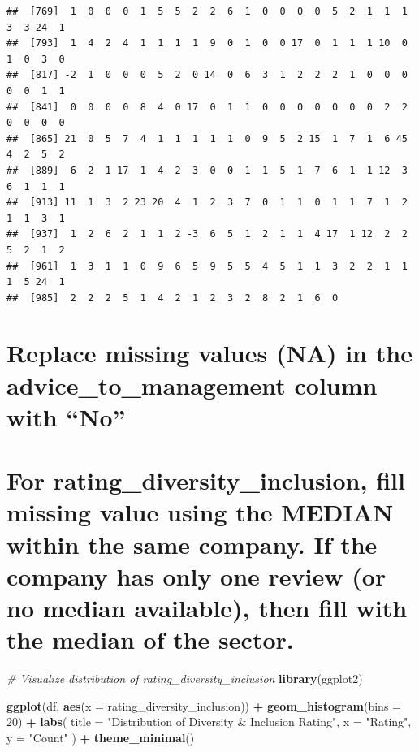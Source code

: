 \documentclass[
]{article}
\newenvironment{Shaded}{\begin{snugshade}}{\end{snugshade}}
\newcommand{\AttributeTok}[1]{\textcolor[rgb]{0.13,0.29,0.53}{#1}}
\newcommand{\CommentTok}[1]{\textcolor[rgb]{0.56,0.35,0.01}{\textit{#1}}}
\newcommand{\DecValTok}[1]{\textcolor[rgb]{0.00,0.00,0.81}{#1}}
\newcommand{\FunctionTok}[1]{\textcolor[rgb]{0.13,0.29,0.53}{\textbf{#1}}}
\newcommand{\NormalTok}[1]{#1}
\newcommand{\OtherTok}[1]{\textcolor[rgb]{0.56,0.35,0.01}{#1}}
\newcommand{\SpecialCharTok}[1]{\textcolor[rgb]{0.81,0.36,0.00}{\textbf{#1}}}
\newcommand{\StringTok}[1]{\textcolor[rgb]{0.31,0.60,0.02}{#1}}
\begin{document}
\begin{verbatim}
##  [769]  1  0  0  0  1  5  5  2  2  6  1  0  0  0  0  5  2  1  1  1  3  3 24  1
##  [793]  1  4  2  4  1  1  1  1  9  0  1  0  0 17  0  1  1  1 10  0  1  0  3  0
##  [817] -2  1  0  0  0  5  2  0 14  0  6  3  1  2  2  2  1  0  0  0  0  0  1  1
##  [841]  0  0  0  0  8  4  0 17  0  1  1  0  0  0  0  0  0  0  2  2  0  0  0  0
##  [865] 21  0  5  7  4  1  1  1  1  1  0  9  5  2 15  1  7  1  6 45  4  2  5  2
##  [889]  6  2  1 17  1  4  2  3  0  0  1  1  5  1  7  6  1  1 12  3  6  1  1  1
##  [913] 11  1  3  2 23 20  4  1  2  3  7  0  1  1  0  1  1  7  1  2  1  1  3  1
##  [937]  1  2  6  2  1  1  2 -3  6  5  1  2  1  1  4 17  1 12  2  2  5  2  1  2
##  [961]  1  3  1  1  0  9  6  5  9  5  5  4  5  1  1  3  2  2  1  1  1  5 24  1
##  [985]  2  2  2  5  1  4  2  1  2  3  2  8  2  1  6  0
\end{verbatim}

\section{Replace missing values (NA) in the advice\_to\_management
column with
``No''}\label{replace-missing-values-na-in-the-advice_to_management-column-with-no}

\begin{Shaded}
\end{Shaded}

\section{For rating\_diversity\_inclusion, fill missing value using the
MEDIAN within the same company. If the company has only one review (or
no median available), then fill with the median of the
sector.}\label{for-rating_diversity_inclusion-fill-missing-value-using-the-median-within-the-same-company.-if-the-company-has-only-one-review-or-no-median-available-then-fill-with-the-median-of-the-sector.}

\begin{Shaded}
\begin{Highlighting}[]
\CommentTok{\# Visualize distribution of rating\_diversity\_inclusion}
\FunctionTok{library}\NormalTok{(ggplot2)}

\FunctionTok{ggplot}\NormalTok{(df, }\FunctionTok{aes}\NormalTok{(}\AttributeTok{x =}\NormalTok{ rating\_diversity\_inclusion)) }\SpecialCharTok{+}
  \FunctionTok{geom\_histogram}\NormalTok{(}\AttributeTok{bins =} \DecValTok{20}\NormalTok{) }\SpecialCharTok{+}
  \FunctionTok{labs}\NormalTok{(}
    \AttributeTok{title =} \StringTok{"Distribution of Diversity \& Inclusion Rating"}\NormalTok{,}
    \AttributeTok{x =} \StringTok{"Rating"}\NormalTok{,}
    \AttributeTok{y =} \StringTok{"Count"}
\NormalTok{  ) }\SpecialCharTok{+}
  \FunctionTok{theme\_minimal}\NormalTok{()}
\end{Highlighting}
\end{Shaded}
\end{document}
